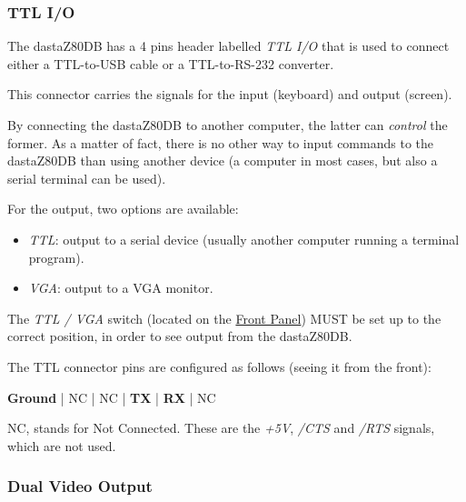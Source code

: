         \subsubsection{TTL I/O}

        The dastaZ80DB has a 4 pins header labelled \textit{TTL I/O} that is
        used to connect either a TTL-to-USB cable or a TTL-to-RS-232 converter.

        This connector carries the signals for the input (keyboard) and output
        (screen).

        By connecting the dastaZ80DB to another computer, the latter can
        \textit{control} the former. As a matter of fact, there is no other way
        to input commands to the dastaZ80DB than using another device (a
        computer in most cases, but also a serial terminal can be used).

        For the output, two options are available:

        \begin{itemize}
            \item \textit{TTL}: output to a serial device (usually another
                computer running a terminal program).
            \item \textit{VGA}: output to a VGA monitor.
        \end{itemize}

        The \textit{TTL / VGA} switch (located on the \hyperref[subsec:frontpanel]
        {Front Panel}) MUST be set up to the correct position, in order to see
        output from the dastaZ80DB.

        The TTL connector pins are configured as follows (seeing it from the
        front):

        \textbf{Ground} | NC | NC | \textbf{TX} | \textbf{RX} | NC

        NC, stands for Not Connected. These are the \textit{+5V}, \textit{/CTS}
        and \textit{/RTS} signals, which are not used.



        \subsubsection{Dual Video Output}

